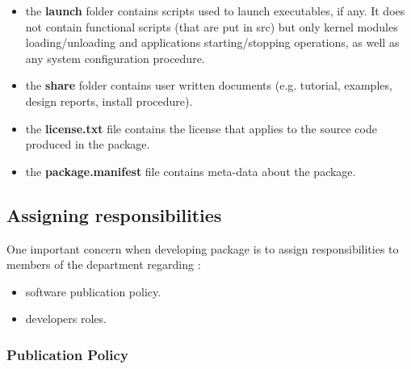 \documentclass[12pt,a4paper]{article}
\begin{document}
\begin{itemize}
\item the \textbf{launch} folder contains scripts used to launch executables, if any. It does not contain functional scripts (that are put in src) but only kernel modules loading/unloading and applications starting/stopping operations, as well as any system configuration procedure.
\item the \textbf{share} folder contains user written documents (e.g. tutorial, examples, design reports, install procedure).
\item the \textbf{license.txt} file contains the license that applies to the source code produced in the package.
\item the \textbf{package.manifest} file contains meta-data about the package.
\end{itemize}

\subsection{Assigning responsibilities}

One important concern when developing package is to assign responsibilities to members of the department regarding :
\begin{itemize}
\item software publication policy.
\item developers roles.
\end{itemize}


\subsubsection{Publication Policy}
\end{document}
